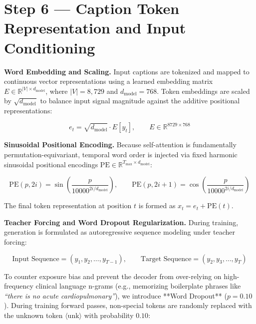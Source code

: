 \section{Step 6 --- Caption Token Representation and Input Conditioning}

\textbf{Word Embedding and Scaling.}
Input captions are tokenized and mapped to continuous vector representations using a learned embedding matrix $E \in \mathbb{R}^{|V| \times d_{\text{model}}}$, where $|V| = 8{,}729$ and $d_{\text{model}} = 768$. Token embeddings are scaled by $\sqrt{d_{\text{model}}}$ to balance input signal magnitude against the additive positional representations:

\begin{equation}
e_t = \sqrt{d_{\text{model}}} \cdot E[y_t], \qquad E \in \mathbb{R}^{8729 \times 768} \tag{3.15}
\end{equation}

\textbf{Sinusoidal Positional Encoding.}
Because self-attention is fundamentally permutation-equivariant, temporal word order is injected via fixed harmonic sinusoidal positional encodings $\mathrm{PE} \in \mathbb{R}^{T_{\text{max}} \times d_{\text{model}}}$:

\begin{equation}
\mathrm{PE}(p, 2i) = \sin\left(\frac{p}{10000^{2i/d_{\text{model}}}}\right), \qquad \mathrm{PE}(p, 2i+1) = \cos\left(\frac{p}{10000^{2i/d_{\text{model}}}}\right) \tag{3.16}
\end{equation}

The final token representation at position $t$ is formed as $x_t = e_t + \mathrm{PE}(t)$.

\textbf{Teacher Forcing and Word Dropout Regularization.}
During training, generation is formulated as autoregressive sequence modeling under teacher forcing:

\begin{equation}
\text{Input Sequence} = (y_1, y_2, \ldots, y_{T-1}), \qquad \text{Target Sequence} = (y_2, y_3, \ldots, y_T) \tag{3.17}
\end{equation}

To counter exposure bias and prevent the decoder from over-relying on high-frequency clinical language n-grams (e.g., memorizing boilerplate phrases like \emph{``there is no acute cardiopulmonary''}), we introduce **Word Dropout** ($p = 0.10$). During training forward passes, non-special tokens are randomly replaced with the unknown token $\langle\mathrm{unk}\rangle$ with probability $0.10$:


